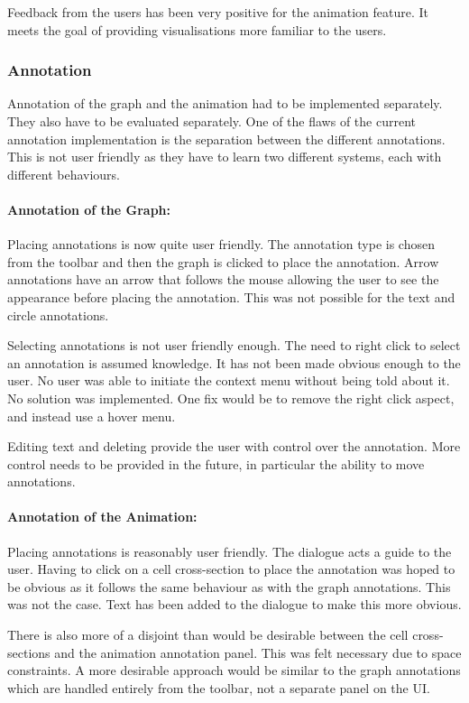 Feedback from the users has been very positive for the animation feature.  It meets the goal of providing visualisations more familiar to the users.

\subsubsection{Annotation}

Annotation of the graph and the animation had to be implemented separately.  They also have to be evaluated separately.  One of the flaws of the current annotation implementation is the separation between the different annotations.  This is not user friendly as they have to learn two different systems, each with different behaviours.

\paragraph*{Annotation of the Graph:} Placing annotations is now quite user friendly.  The annotation type is chosen from the toolbar and then the graph is clicked to place the annotation.  Arrow annotations have an arrow that follows the mouse allowing the user to see the appearance before placing the annotation.  This was not possible for the text and circle annotations.

Selecting annotations is not user friendly enough.  The need to right click to select an annotation is assumed knowledge.  It has not been made obvious enough to the user.  No user was able to initiate the context menu without being told about it.  No solution was implemented.  One fix would be to remove the right click aspect, and instead use a hover menu.

Editing text and deleting provide the user with control over the annotation. More control needs to be provided in the future, in particular the ability to move annotations.

\paragraph*{Annotation of the Animation:} Placing annotations is reasonably user friendly.  The dialogue acts a guide to the user.  Having to click on a cell cross-section to place the annotation was hoped to be obvious as it follows the same behaviour as with the graph annotations.  This was not the case.  Text has been added to the dialogue to make this more obvious.

There is also more of a disjoint than would be desirable between the cell cross-sections and the animation annotation panel.  This was felt necessary due to space constraints.  A more desirable approach would be similar to the graph annotations which are handled entirely from the toolbar, not a separate panel on the \ac{UI}.

